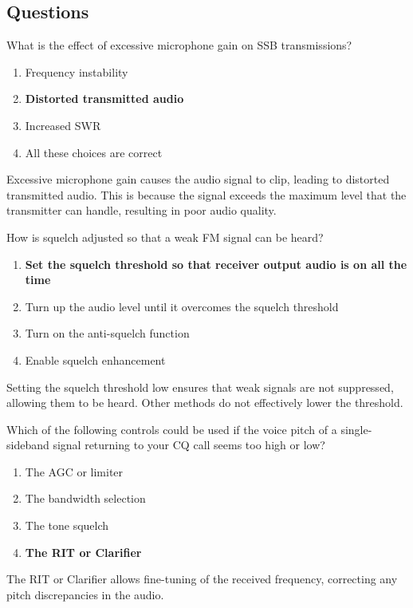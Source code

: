 \subsection*{Questions}
\begin{tcolorbox}[colback=gray!10!white,colframe=black!75!black,title={T4B01}]
    What is the effect of excessive microphone gain on SSB transmissions?
    \begin{enumerate}[label=\Alph*,noitemsep]
        \item Frequency instability
        \item \textbf{Distorted transmitted audio}
        \item Increased SWR
        \item All these choices are correct
    \end{enumerate}
\end{tcolorbox}
Excessive microphone gain causes the audio signal to clip, leading to distorted transmitted audio. This is because the signal exceeds the maximum level that the transmitter can handle, resulting in poor audio quality.


\begin{tcolorbox}[colback=gray!10!white,colframe=black!75!black,title={T4B03}]
    How is squelch adjusted so that a weak FM signal can be heard?
    \begin{enumerate}[label=\Alph*,noitemsep]
        \item \textbf{Set the squelch threshold so that receiver output audio is on all the time}
        \item Turn up the audio level until it overcomes the squelch threshold
        \item Turn on the anti-squelch function
        \item Enable squelch enhancement
    \end{enumerate}
\end{tcolorbox}
Setting the squelch threshold low ensures that weak signals are not suppressed, allowing them to be heard. Other methods do not effectively lower the threshold.


\begin{tcolorbox}[colback=gray!10!white,colframe=black!75!black,title={T4B06}]
    Which of the following controls could be used if the voice pitch of a single-sideband signal returning to your CQ call seems too high or low?
    \begin{enumerate}[label=\Alph*,noitemsep]
        \item The AGC or limiter
        \item The bandwidth selection
        \item The tone squelch
        \item \textbf{The RIT or Clarifier}
    \end{enumerate}
\end{tcolorbox}
The RIT or Clarifier allows fine-tuning of the received frequency, correcting any pitch discrepancies in the audio.


